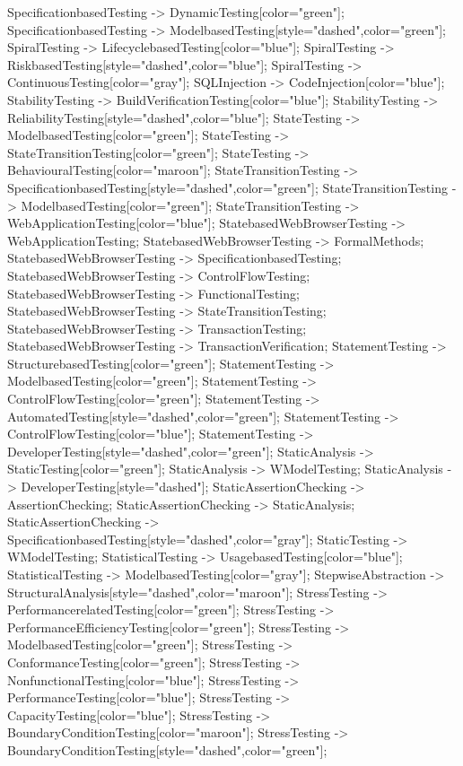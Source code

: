 \documentclass{article}
\begin{document}
{SpecificationbasedTesting -> DynamicTesting[color="green"];
SpecificationbasedTesting -> ModelbasedTesting[style="dashed",color="green"];
SpiralTesting -> LifecyclebasedTesting[color="blue"];
SpiralTesting -> RiskbasedTesting[style="dashed",color="blue"];
SpiralTesting -> ContinuousTesting[color="gray"];
SQLInjection -> CodeInjection[color="blue"];
StabilityTesting -> BuildVerificationTesting[color="blue"];
StabilityTesting -> ReliabilityTesting[style="dashed",color="blue"];
StateTesting -> ModelbasedTesting[color="green"];
StateTesting -> StateTransitionTesting[color="green"];
StateTesting -> BehaviouralTesting[color="maroon"];
StateTransitionTesting -> SpecificationbasedTesting[style="dashed",color="green"];
StateTransitionTesting -> ModelbasedTesting[color="green"];
StateTransitionTesting -> WebApplicationTesting[color="blue"];
StatebasedWebBrowserTesting -> WebApplicationTesting;
StatebasedWebBrowserTesting -> FormalMethods;
StatebasedWebBrowserTesting -> SpecificationbasedTesting;
StatebasedWebBrowserTesting -> ControlFlowTesting;
StatebasedWebBrowserTesting -> FunctionalTesting;
StatebasedWebBrowserTesting -> StateTransitionTesting;
StatebasedWebBrowserTesting -> TransactionTesting;
StatebasedWebBrowserTesting -> TransactionVerification;
StatementTesting -> StructurebasedTesting[color="green"];
StatementTesting -> ModelbasedTesting[color="green"];
StatementTesting -> ControlFlowTesting[color="green"];
StatementTesting -> AutomatedTesting[style="dashed",color="green"];
StatementTesting -> ControlFlowTesting[color="blue"];
StatementTesting -> DeveloperTesting[style="dashed",color="green"];
StaticAnalysis -> StaticTesting[color="green"];
StaticAnalysis -> WModelTesting;
StaticAnalysis -> DeveloperTesting[style="dashed"];
StaticAssertionChecking -> AssertionChecking;
StaticAssertionChecking -> StaticAnalysis;
StaticAssertionChecking -> SpecificationbasedTesting[style="dashed",color="gray"];
StaticTesting -> WModelTesting;
StatisticalTesting -> UsagebasedTesting[color="blue"];
StatisticalTesting -> ModelbasedTesting[color="gray"];
StepwiseAbstraction -> StructuralAnalysis[style="dashed",color="maroon"];
StressTesting -> PerformancerelatedTesting[color="green"];
StressTesting -> PerformanceEfficiencyTesting[color="green"];
StressTesting -> ModelbasedTesting[color="green"];
StressTesting -> ConformanceTesting[color="green"];
StressTesting -> NonfunctionalTesting[color="blue"];
StressTesting -> PerformanceTesting[color="blue"];
StressTesting -> CapacityTesting[color="blue"];
StressTesting -> BoundaryConditionTesting[color="maroon"];
StressTesting -> BoundaryConditionTesting[style="dashed",color="green"];
}
\end{document}
